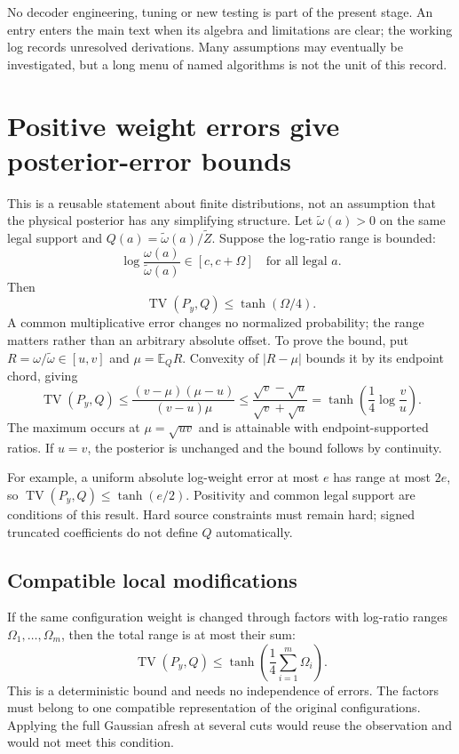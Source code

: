 \documentclass[10pt,a4paper]{article}
\newcommand{\E}{\mathbb E}
\newcommand{\TV}{\operatorname{TV}}
\begin{document}
No decoder engineering, tuning or new testing is part of the present stage. An entry enters the main text
when its algebra and limitations are clear; the working log records unresolved derivations. Many assumptions
may eventually be investigated, but a long menu of named algorithms is not the unit of this record.

\section{Positive weight errors give posterior-error bounds}
\label{sec:positive-errors}
This is a reusable statement about finite distributions, not an assumption that the physical posterior has
any simplifying structure. Let $\widetilde\omega(a)>0$ on the same legal support and $Q(a)=\widetilde\omega(a)/\widetilde Z$.
Suppose the log-ratio range is bounded:
\[
 \log\frac{\omega(a)}{\widetilde\omega(a)}\in[c,c+\Omega]\quad\text{for all legal }a.
\]
Then
\begin{equation}
 \TV(P_y,Q)\leq\tanh(\Omega/4).
 \label{eq:tv-range}
\end{equation}
A common multiplicative error changes no normalized probability; the range matters rather than an arbitrary
absolute offset. To prove the bound, put $R=\omega/\widetilde\omega\in[u,v]$ and $\mu=\E_QR$. Convexity of
$|R-\mu|$ bounds it by its endpoint chord, giving
\[
 \TV(P_y,Q)\leq\frac{(v-\mu)(\mu-u)}{(v-u)\mu}
 \leq\frac{\sqrt v-\sqrt u}{\sqrt v+\sqrt u}
 =\tanh\left(\frac14\log\frac vu\right).
\]
The maximum occurs at $\mu=\sqrt{uv}$ and is attainable with endpoint-supported ratios. If $u=v$, the
posterior is unchanged and the bound follows by continuity.

For example, a uniform absolute log-weight error at most $e$ has range at most $2e$, so
$\TV(P_y,Q)\leq\tanh(e/2)$. Positivity and common legal support are conditions of this result.
Hard source constraints must remain hard; signed truncated coefficients do not define $Q$ automatically.

\subsection{Compatible local modifications}
If the same configuration weight is changed through factors with log-ratio ranges $\Omega_1,\ldots,\Omega_m$,
then the total range is at most their sum:
\[
 \TV(P_y,Q)\leq\tanh\left(\frac14\sum_{i=1}^m\Omega_i\right).
\]
This is a deterministic bound and needs no independence of errors. The factors must belong to one compatible
representation of the original configurations. Applying the full Gaussian afresh at several cuts would
reuse the observation and would not meet this condition.
\end{document}
